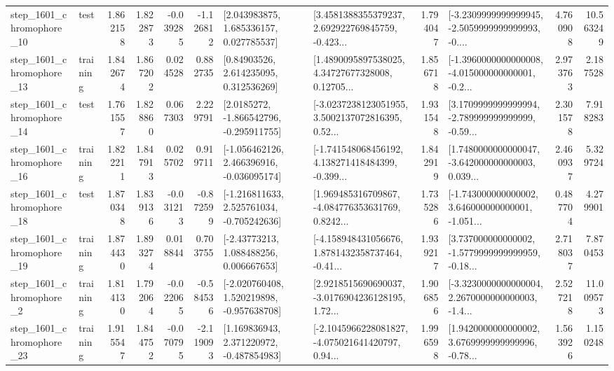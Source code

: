 \begin{tabular}{llrrrrllrlrr}
 step\_1601\_chromophore\_10 &      test &      1.862158 &    1.822873 &     -0.039285 & -1.126812 &     [2.043983875, 1.685336157, 0.027785537] &  [3.4581388355379237, 2.692922769845759, -0.423... &       1.794047 &  [-3.2309999999999945, -2.5059999999999993, -0.... &            4.760908 &         10.563249 \\
 step\_1601\_chromophore\_13 &  training &      1.842674 &    1.867202 &      0.024528 &  0.882735 &      [0.84903526, 2.614235095, 0.312536269] &  [1.4890095897538025, 4.34727677328008, 0.12705... &       1.856718 &  [-1.3960000000000008, -4.015000000000001, -0.2... &            2.973763 &          2.187528 \\
 step\_1601\_chromophore\_14 &      test &      1.761557 &    1.828860 &      0.067303 &  2.229791 &     [2.0185272, -1.866542796, -0.295911755] &  [-3.0237238123051955, 3.5002137072816395, 0.52... &       1.931548 &  [3.1709999999999994, -2.789999999999999, -0.59... &            2.301578 &          7.918283 \\
 step\_1601\_chromophore\_16 &  training &      1.822211 &    1.847913 &      0.025702 &  0.919711 &   [-1.056462126, 2.466396916, -0.036095174] &  [-1.741548068456192, 4.138271418484399, -0.399... &       1.842919 &  [1.7480000000000047, -3.642000000000003, 0.039... &            2.460937 &          5.329724 \\
 step\_1601\_chromophore\_18 &      test &      1.870348 &    1.839136 &     -0.031213 & -0.872599 &   [-1.216811633, 2.525761034, -0.705242636] &  [1.969485316709867, -4.084776353631769, 0.8242... &       1.735286 &  [-1.743000000000002, 3.646000000000001, -1.051... &            0.487704 &          4.279901 \\
 step\_1601\_chromophore\_19 &  training &      1.874430 &    1.893274 &      0.018844 &  0.703755 &     [-2.43773213, 1.088488256, 0.006667653] &  [-4.158948431056676, 1.8781432358737464, -0.41... &       1.939217 &  [3.737000000000002, -1.5779999999999959, -0.18... &            2.718037 &          7.870453 \\
  step\_1601\_chromophore\_2 &  training &      1.814130 &    1.792064 &     -0.022065 & -0.584536 &   [-2.020760408, 1.520219898, -0.957638708] &  [2.9218515690690037, -3.0176904236128195, 1.72... &       1.906856 &  [-3.3230000000000004, 2.2670000000000003, -1.4... &            2.527218 &         11.009573 \\
 step\_1601\_chromophore\_23 &  training &      1.915547 &    1.844752 &     -0.070795 & -2.119093 &    [1.169836943, 2.371220972, -0.487854983] &  [-2.1045966228081827, -4.075021641420797, 0.94... &       1.996598 &  [1.9420000000000002, 3.6769999999999996, -0.78... &            1.563926 &          1.150248 \\

\end{tabular}

